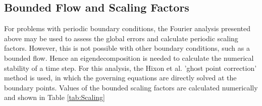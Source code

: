 \documentclass[conf]{new-aiaa}
\begin{document}
\subsection{Bounded Flow and Scaling Factors}
\label{subsec:Bounded_Scaling}
For problems with periodic boundary conditions, the Fourier analysis presented above may be used to assess the global errors and calculate periodic scaling factors. 
However, this is not possible with other boundary conditions, such as a bounded flow. 
Hence an eigendecomposition is needed to calculate the numerical stability of a time step. 
For this analysis, the Hixon et al. 'ghost point correction' method is used, \cite{GPT, RDRP} in which the governing equations are directly solved at the boundary points. 
Values of the bounded scaling factors are calculated numerically and shown in Table \ref{tab:Scaling}
\end{document}
